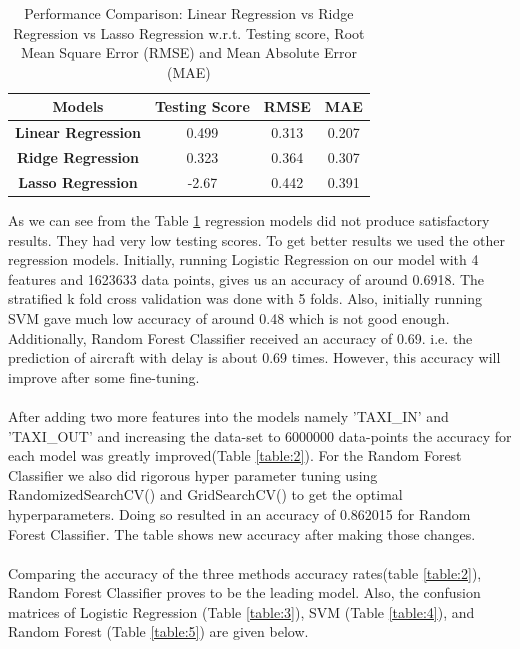 \documentclass[conference]{IEEEtran}
\begin{document}
\renewcommand{\arraystretch}{1.5}
\begin{table}[h!]
\normalsize

\begin{tabular}{|c|c|c|c|}
\hline
\textbf{Models} & \textbf{Testing Score} & \textbf{RMSE} & \textbf{MAE} \\ \hline
\textbf{Linear Regression} & 0.499 & 0.313 & 0.207 \\ \hline
\textbf{Ridge Regression} & 0.323 & 0.364 & 0.307 \\ \hline
\textbf{Lasso Regression} & -2.67 & 0.442 & 0.391 \\ \hline
\end{tabular}
\caption{Performance Comparison: Linear Regression vs Ridge Regression vs Lasso Regression w.r.t. Testing score, Root Mean Square Error (RMSE) and Mean Absolute Error (MAE)}
\label{table:1}
\end{table}
As we can see from the Table \ref{table:1} regression models did not produce satisfactory results. They had very low testing  scores. To get better results we used the other regression models. Initially, running Logistic Regression on our model with 4 features and 1623633 data points, gives us an accuracy of around 0.6918. The stratified k fold cross validation was done with 5 folds. Also, initially running SVM gave much low accuracy of around 0.48 which is not good enough. Additionally, Random Forest Classifier received an accuracy of 0.69. i.e. the prediction of aircraft with delay is about 0.69 times. However, this accuracy will improve after some fine-tuning.
\\\\
After adding two more features into the models namely 'TAXI\_IN' and 'TAXI\_OUT' and increasing the data-set to 6000000 data-points the accuracy for each model was greatly improved(Table \ref{table:2}). For the Random Forest Classifier we also did rigorous hyper parameter tuning using RandomizedSearchCV() and GridSearchCV() to get the optimal hyperparameters. Doing so resulted in an accuracy of 0.862015 for Random Forest Classifier. The table shows new accuracy after making those changes.
\\\\
Comparing the accuracy of the three methods accuracy rates(table \ref{table:2}), Random Forest Classifier proves to be the leading model. Also, the confusion matrices of Logistic Regression (Table \ref{table:3}), SVM (Table \ref{table:4}), and Random Forest (Table \ref{table:5}) are given below.
 
\end{document}
